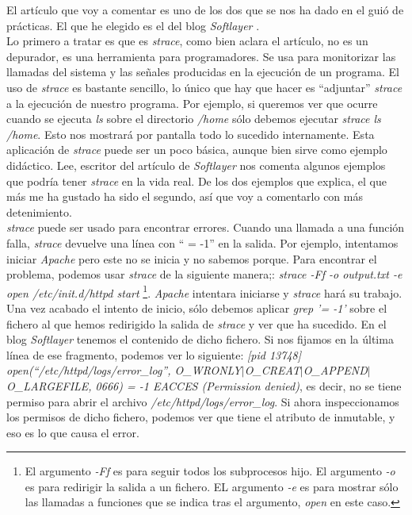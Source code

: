 \documentclass[a4paper,titlepage,12pt]{scrartcl}	%
\numberwithin{figure}{section} %
\numberwithin{table}{section} %
\begin{document}
	El artículo que voy a comentar es uno de los dos que se nos ha dado en el guió de prácticas. El que he elegido es el del blog \textit{Softlayer} \cite{strace}. \\
	
	Lo primero a tratar es que es \textit{strace}, como bien aclara el artículo, no es un depurador, es una herramienta para programadores. Se usa para monitorizar las llamadas del sistema y las señales producidas en la ejecución de un programa. El uso de \textit{strace} es bastante sencillo, lo único que hay que hacer es ``adjuntar'' \textit{strace} a la ejecución de nuestro programa. Por ejemplo, si queremos ver que ocurre cuando se ejecuta \textit{ls} sobre el directorio \textit{/home} sólo debemos ejecutar \textit{strace ls /home}. Esto nos mostrará por pantalla todo lo sucedido internamente. Esta aplicación de \textit{strace} puede ser un poco básica, aunque bien sirve como ejemplo didáctico. Lee, escritor del artículo de \textit{Softlayer} \cite{strace} nos comenta algunos ejemplos que podría tener \textit{strace} en la vida real. De los dos ejemplos que explica, el que más me ha gustado ha sido el segundo, así que voy a comentarlo con más detenimiento. \\
	
	\textit{strace} puede ser usado para encontrar errores. Cuando una llamada a una función falla, \textit{strace} devuelve una línea con `` = -1'' en la salida. Por ejemplo, intentamos iniciar \textit{Apache} pero este no se inicia y no sabemos porque. Para encontrar el problema, podemos usar \textit{strace} de la siguiente manera;: \textit{strace -Ff -o output.txt -e open /etc/init.d/httpd start} \footnote{El argumento \textit{-Ff} es para seguir todos los subprocesos hijo. El argumento \textit{-o} es para redirigir la salida a un fichero. EL argumento \textit{-e} es para mostrar sólo las llamadas a funciones que se indica tras el argumento, \textit{open} en este caso.}. \textit{Apache} intentara iniciarse y \textit{strace} hará su trabajo. Una vez acabado el intento de inicio, sólo debemos aplicar \textit{grep '= -1'} sobre el fichero al que hemos redirigido la salida de \textit{strace} y ver que ha sucedido. En el blog \textit{Softlayer} tenemos el contenido de dicho fichero. Si nos fijamos en la última línea de ese fragmento, podemos ver lo siguiente: \textit{[pid 13748] open(``/etc/httpd/logs/error\_log'', O\_WRONLY$\mid$O\_CREAT$\mid$O\_APPEND$\mid$O\_LARGEFILE, 0666) = -1 EACCES (Permission denied)}, es decir, no se tiene permiso para abrir el archivo \textit{/etc/httpd/logs/error\_log}. Si ahora inspeccionamos los permisos de dicho fichero, podemos ver que tiene el atributo de inmutable, y eso es lo que causa el error. \\
	
\end{document}

